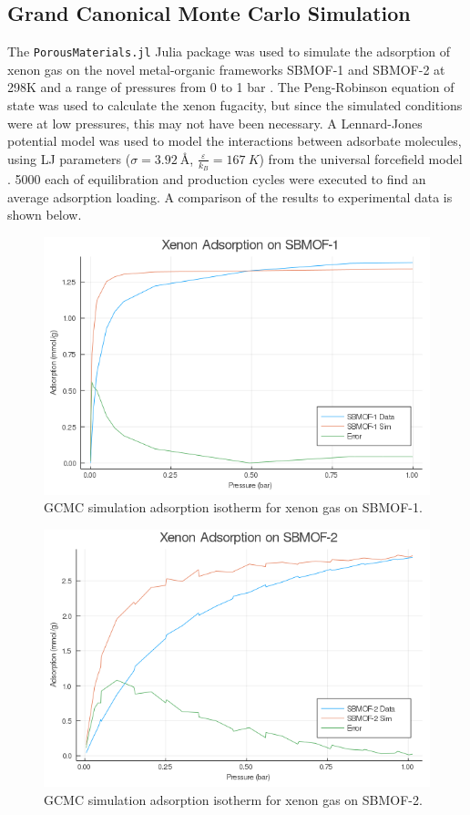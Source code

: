 \documentclass{article}
\begin{document}
\subsection{Grand Canonical Monte Carlo Simulation}
The \texttt{PorousMaterials.jl} Julia package was used to simulate the adsorption of xenon gas on the novel metal-organic frameworks SBMOF-1 and SBMOF-2 at 298K and a range of pressures from 0 to 1 bar \cite{porous-materials}.
The Peng-Robinson equation of state was used to calculate the xenon fugacity, but since the simulated conditions were at low pressures, this may not have been necessary. A Lennard-Jones potential model was used to model the interactions between adsorbate molecules, using LJ parameters ($\sigma=\SI{3.92}{\angstrom}$, $\frac{\varepsilon}{k_B} = \SI{167}{K}$) from the universal forcefield model \cite{uff}. 5000 each of equilibration and production cycles were executed to find an average adsorption loading. A comparison of the results to experimental data is shown below.
\begin{figure}[H]
    \centering
    \includegraphics[width=\textwidth]{fig/sbmof1-pengrob-error.png}
    \caption{GCMC simulation adsorption isotherm for xenon gas on SBMOF-1.}
    \label{fig:sbmof1-gcmc}
\end{figure}
\begin{figure}[H]
    \centering
    \includegraphics[width=\textwidth]{fig/sbmof2-pengrob-error.png}
    \caption{GCMC simulation adsorption isotherm for xenon gas on SBMOF-2.}
    \label{fig:sbmof2-gcmc}
\end{figure}
\end{document}
